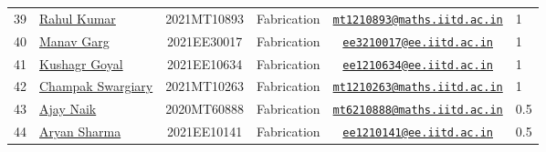 \documentclass[table]{rapportCS}
\begin{document}
\begin{table}[h]
\begin{tabular}{|p{.3cm}|p{2.9cm}|c|p{2cm}|c|p{.3cm}|}
        \hline
        39 & \href{https://www.linkedin.com/in/rahul-kumar-9a021a236/}{Rahul Kumar} & 2021MT10893 & Fabrication & \href{mailto:mt1210893@maths.iitd.ac.in}{\nolinkurl{mt1210893@maths.iitd.ac.in}} & 1 \\
        40 & \href{https://www.linkedin.com/in/manav-garg-0a240a175}{Manav Garg} & 2021EE30017 & Fabrication & \href{mailto:ee3210017@ee.iitd.ac.in}{\nolinkurl{ee3210017@ee.iitd.ac.in}} & 1 \\
        41 & \href{www.linkedin.com/in/kushagrgoyal}{Kushagr Goyal} & 2021EE10634 & Fabrication & \href{mailto:ee1210634@ee.iitd.ac.in}{\nolinkurl{ee1210634@ee.iitd.ac.in}} & 1 \\
        42 & \href{https://www.linkedin.com/in/champak-swargiary-a87b04230/}{Champak Swargiary} & 2021MT10263 & Fabrication & \href{mailto:mt1210263@maths.iitd.ac.in}{\nolinkurl{mt1210263@maths.iitd.ac.in}} & 1 \\
        
43 & \href{https://www.linkedin.com/in/ajay-ramavath-/}{Ajay Naik} &
2020MT60888 & Fabrication  &
\href{mailto:mt6210888@maths.iitd.ac.in}{\nolinkurl{mt6210888@maths.iitd.ac.in}}
& 0.5 \\
44 & \href{https://www.linkedin.com/in/aryan-sharma-326657230/}{Aryan
Sharma} & 2021EE10141 & Fabrication  &
\href{mailto:ee1210141@ee.iitd.ac.in}{\nolinkurl{ee1210141@ee.iitd.ac.in}}
& 0.5 \\
\hline
\end{tabular}

\end{table}
\end{document}
